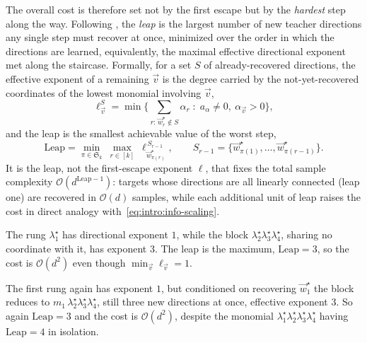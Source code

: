 The overall cost is therefore set not by the first escape but by the \emph{hardest} step along the way. Following \citet{abbe2023sgd}, the \emph{leap} is the largest number of new teacher directions any single step must recover at once, minimized over the order in which the directions are learned, equivalently, the maximal effective directional exponent met along the staircase. Formally, for a set \(S\) of already-recovered directions, the effective exponent of a remaining \(\vec{v}\) is the degree carried by the not-yet-recovered coordinates of the lowest monomial involving \(\vec{v}\),
\begin{equation}
    \label{eq:intro:eff-exponent}
    \ell^{S}_{\vec{v}} = \min\Big\{\textstyle\sum_{r:\,\vec{w}^\star_r \notin S}\alpha_r \;:\; a_\alpha \neq 0,\ \alpha_{\vec{v}} > 0\Big\},
\end{equation}
and the leap is the smallest achievable value of the worst step,
\begin{equation}
    \label{eq:intro:leap-complexity}
    \mathrm{Leap} = \min_{\pi \in \mathfrak{S}_k}\ \max_{r \in [k]}\ \ell^{\,S_{r-1}}_{\vec{w}^\star_{\pi(r)}},
    \qquad S_{r-1} = \{\vec{w}^\star_{\pi(1)},\ldots,\vec{w}^\star_{\pi(r-1)}\}.
\end{equation}
It is the leap, not the first-escape exponent \(\ell\), that fixes the total sample complexity \(\mathcal{O}(d^{\mathrm{Leap}-1})\): targets whose directions are all linearly connected (leap one) are recovered in \(\mathcal{O}(d)\) samples, while each additional unit of leap raises the cost in direct analogy with~\eqref{eq:intro:info-scaling}.
\begin{example}
    The rung \(\lambda^\star_1\) has directional exponent \(1\), while the block \(\lambda^\star_2\lambda^\star_3\lambda^\star_4\), sharing no coordinate with it, has exponent \(3\). The leap is the maximum, \(\mathrm{Leap} = 3\), so the cost is \(\mathcal{O}(d^2)\) even though \(\min_{\vec{v}}\ell_{\vec{v}} = 1\).
\end{example}
\begin{example}
    The first rung again has exponent \(1\), but conditioned on recovering \(\vec{w}^\star_1\) the block reduces to \(m_1\,\lambda^\star_2\lambda^\star_3\lambda^\star_4\), still three new directions at once, effective exponent \(3\). So again \(\mathrm{Leap} = 3\) and the cost is \(\mathcal{O}(d^2)\), despite the monomial \(\lambda^\star_1\lambda^\star_2\lambda^\star_3\lambda^\star_4\) having \(\text{Leap} = 4\) in isolation.
\end{example}






